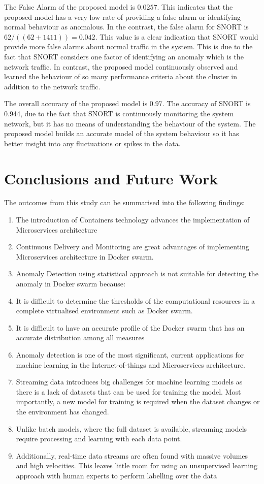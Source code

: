 \documentclass[sigconf]{acmart}
\begin{document}
The False Alarm of the proposed model  is $0.0257$. This indicates that the proposed model has a very low rate of providing a false alarm or identifying normal behaviour as anomalous. In the contrast, the false alarm for SNORT is $62/((62+1411))=0.042$. This value is a clear indication that SNORT would provide more false alarms about normal traffic in the system. This is due to the fact that SNORT considers one factor of identifying an anomaly which is the network traffic. In contrast, the proposed model continuously observed and learned the behaviour of so many performance criteria about the cluster in addition to the network traffic. 

The overall accuracy of the proposed model is $0.97$. The accuracy of SNORT is 0.944, due to the fact that SNORT is continuously monitoring the system network, but it has no means of understanding the behaviour of the system. The proposed model builds an accurate model of the system behaviour so it has better insight into any fluctuations or spikes in the data. 

 \section{Conclusions and Future Work}\label{sec:Conclusion}
 The outcomes from this study can be summarised into the following findings: 
\begin{enumerate}
\item  The introduction of Containers technology advances the implementation of Microservices architecture
\item Continuous Delivery and Monitoring are great advantages of implementing Microservices architecture in Docker swarm.  
\item Anomaly Detection using statistical approach is not suitable for detecting the anomaly in Docker swarm because: 
\item It is difficult to determine the thresholds of the computational resources in a complete virtualised environment such as Docker swarm. 
\item It is difficult to have an accurate profile of the Docker swarm that has an accurate distribution among all measures
\item Anomaly detection is one of the most significant, current applications for machine learning in the Internet-of-things and Microservices architecture. 
\item Streaming data introduces big challenges for machine learning models as there is a lack of datasets that can be used for training the model. Most importantly, a new model for training is required when the dataset changes or the environment has changed. 
\item Unlike batch models, where the full dataset is available, streaming models require processing and learning with each data point. 
\item Additionally, real-time data streams are often found with massive volumes and high velocities. This leaves little room for using an unsupervised learning approach with human experts to perform labelling over the data 
\end{enumerate}


 
\end{document}
